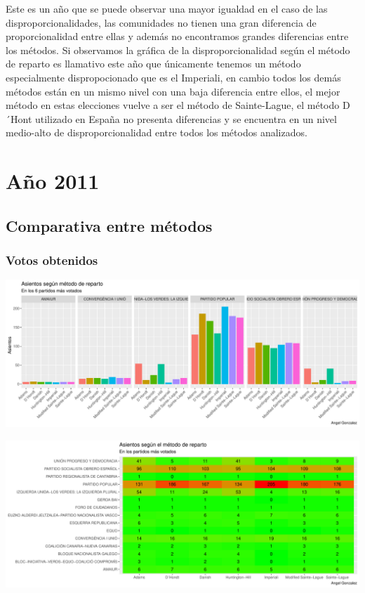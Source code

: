\documentclass[12pt,a4paper,]{book}
\numberwithin{dummy}{section}
\theoremstyle{ocrenumbox}
\theoremstyle{blacknumex}
\theoremstyle{blacknumbox}
\theoremstyle{ocrenum}
\theoremstyle{ocrenum}
\begin{document}
Este es un año que se puede observar una mayor igualdad en el caso de
las disproporcionalidades, las comunidades no tienen una gran diferencia
de proporcionalidad entre ellas y además no encontramos grandes
diferencias entre los métodos. Si observamos la gráfica de la
disproporcionalidad según el método de reparto es llamativo este año que
únicamente tenemos un método especialmente dispropocionado que es el
Imperiali, en cambio todos los demás métodos están en un mismo nivel con
una baja diferencia entre ellos, el mejor método en estas elecciones
vuelve a ser el método de Sainte-Lague, el método D´Hont utilizado en
España no presenta diferencias y se encuentra en un nivel medio-alto de
disproporcionalidad entre todos los métodos analizados.

\hypertarget{auxf1o-2011}{%
\section{Año 2011}\label{auxf1o-2011}}

\hypertarget{comparativa-entre-muxe9todos-10}{%
\subsection{Comparativa entre
métodos}\label{comparativa-entre-muxe9todos-10}}

\hypertarget{votos-obtenidos-10}{%
\subsubsection{Votos obtenidos}\label{votos-obtenidos-10}}

\begin{center}\includegraphics[width=0.95\linewidth]{figurasR/unnamed-chunk-149-1} \end{center}

\begin{center}\includegraphics[width=0.95\linewidth]{figurasR/unnamed-chunk-149-2} \end{center}
\end{document}
